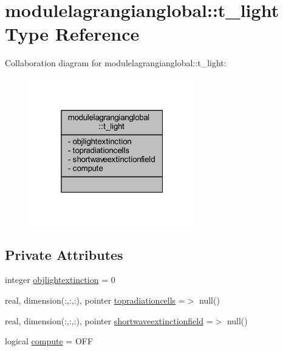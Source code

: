 \hypertarget{structmodulelagrangianglobal_1_1t__light}{}\section{modulelagrangianglobal\+:\+:t\+\_\+light Type Reference}
\label{structmodulelagrangianglobal_1_1t__light}


Collaboration diagram for modulelagrangianglobal\+:\+:t\+\_\+light\+:\nopagebreak
\begin{figure}[H]
\begin{center}
\leavevmode
\includegraphics[width=205pt]{structmodulelagrangianglobal_1_1t__light__coll__graph}
\end{center}
\end{figure}
\subsection*{Private Attributes}
\begin{DoxyCompactItemize}
\item 
integer \mbox{\hyperlink{structmodulelagrangianglobal_1_1t__light_a5cb78485f89787e4e257b08b1b25fd2b}{objlightextinction}} = 0
\item 
real, dimension(\+:,\+:,\+:), pointer \mbox{\hyperlink{structmodulelagrangianglobal_1_1t__light_aaec02bfb2007f6f7880ef075b5a24fe6}{topradiationcells}} =$>$ null()
\item 
real, dimension(\+:,\+:,\+:), pointer \mbox{\hyperlink{structmodulelagrangianglobal_1_1t__light_a1faeedec0b1c2943667766f5824125d7}{shortwaveextinctionfield}} =$>$ null()
\item 
logical \mbox{\hyperlink{structmodulelagrangianglobal_1_1t__light_a7c79e33b722f1d88e8f8e6326a93600f}{compute}} = O\+FF
\end{DoxyCompactItemize}


